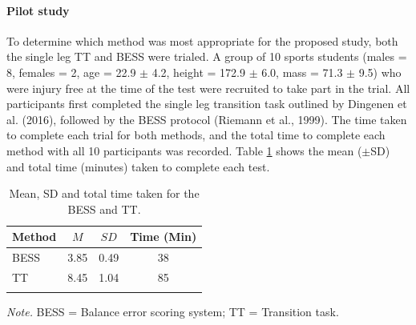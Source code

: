 \documentclass[man,floatsintext]{apa6}
\let\oldparagraph\paragraph
\renewcommand{\paragraph}[1]{\oldparagraph{#1}\mbox{}}
\begin{document}
\hypertarget{pilot-study-1}{%
\paragraph{Pilot study}\label{pilot-study-1}}

To determine which method was most appropriate for the proposed study, both the single leg TT and BESS were trialed.
A group of 10 sports students (males = 8, females = 2, age = 22.9 \(\pm\) 4.2, height = 172.9 \(\pm\) 6.0, mass = 71.3 \(\pm\) 9.5) who were injury free at the time of the test were recruited to take part in the trial.
All participants first completed the single leg transition task outlined by Dingenen et al. (2016), followed by the BESS protocol (Riemann et al., 1999).
The time taken to complete each trial for both methods, and the total time to complete each method with all 10 participants was recorded.
Table \ref{tab:balancetimes} shows the mean (\(\pm\)SD) and total time (minutes) taken to complete each test.

\begin{table}[H]

\begin{center}
\begin{threeparttable}

\caption{\label{tab:balancetimes}Mean, SD and total time taken for the BESS and TT.}

\begin{tabular}{lccc}
\toprule
Method & $M$ & $SD$ & Time (Min)\\
\midrule
BESS & 3.85 & 0.49 & 38\\
TT & 8.45 & 1.04 & 85\\
\bottomrule
\addlinespace
\end{tabular}

\begin{tablenotes}[para]
\normalsize{\textit{Note.} BESS = Balance error scoring system; TT = Transition task.}
\end{tablenotes}

\end{threeparttable}
\end{center}

\end{table}
\end{document}
